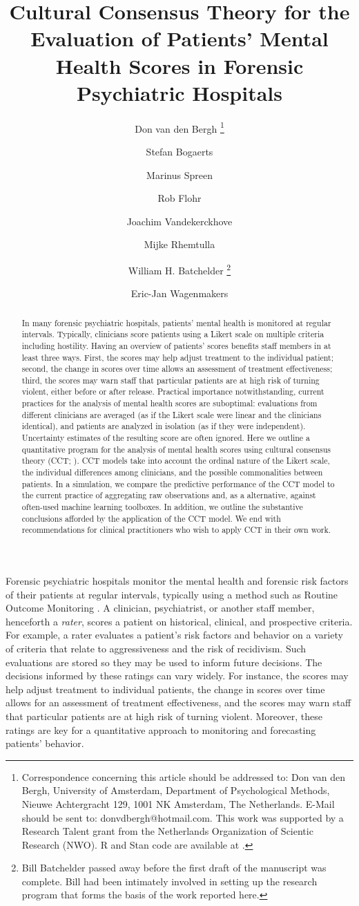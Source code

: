 \documentclass[a4paper,usenames,dvipsnames]{article}
\title{Cultural Consensus Theory for the Evaluation of Patients' Mental Health Scores in Forensic Psychiatric Hospitals}
\author[1]{Don van den Bergh%
\thanks{Correspondence concerning this article should be addressed to: Don van den Bergh, University of Amsterdam, Department of Psychological Methods, Nieuwe Achtergracht 129, 1001 NK Amsterdam, The Netherlands. E-Mail should be sent to: donvdbergh@hotmail.com. This work was supported by a Research Talent grant from the Netherlands Organization of Scientic Research (NWO). R and Stan code are available at \osflink{}.
}}
\author[2]{Stefan Bogaerts}
\author[3]{Marinus Spreen}
\author[3]{\authorcr Rob Flohr}
\author[4]{Joachim Vandekerckhove}
\author[5]{Mijke Rhemtulla}
\author[4]{\authorcr William H. Batchelder%
\thanks{Bill Batchelder passed away before the first draft of the manuscript was complete. Bill had been intimately involved in setting up the research program that forms the basis of the work reported here.}}
\author[1]{Eric-Jan Wagenmakers}
\affil[1]{University of Amsterdam}
\affil[2]{University of Tilburg}
\affil[3]{NHL Stenden University of Applied Sciences}
\affil[4]{University of California Irvine}
\affil[5]{University of California Davis}
\date{}
\begin{document}
\maketitle

\begin{abstract}
In many forensic psychiatric hospitals, patients' mental health is monitored at regular intervals. Typically, clinicians score patients using a Likert scale on multiple criteria including hostility. Having an overview of patients’ scores benefits staff members in at least three ways. First, the scores may help adjust treatment to the individual patient; second, the change in scores over time allows an assessment of treatment effectiveness; third, the scores may warn staff that particular patients are at high risk of turning violent, either before or after release. Practical importance notwithstanding, current practices for the analysis of mental health scores are suboptimal: evaluations from different clinicians are averaged (as if the Likert scale were linear and the clinicians identical), and patients are analyzed in isolation (as if they were independent). Uncertainty estimates of the resulting score are often ignored. Here we outline a quantitative program for the analysis of mental health scores using cultural consensus theory (CCT; ). CCT models take into account the ordinal nature of the Likert scale, the individual differences among clinicians, and the possible commonalities between patients. In a simulation, we compare the predictive performance of the CCT model to the current practice of aggregating raw observations and, as a  alternative, against often-used machine learning toolboxes. In addition, we outline the substantive conclusions afforded by the application of the CCT model. We end with recommendations for clinical practitioners who wish to apply CCT in their own work.
\end{abstract}
\newpage

Forensic psychiatric hospitals monitor the mental health and forensic risk factors of their patients at regular intervals, typically using a method such as Routine Outcome Monitoring \cite{deBeurs2011ROM}. A clinician, psychiatrist, or another staff member, henceforth a \textit{rater}, scores a patient on historical, clinical, and prospective criteria. For example, a rater evaluates a patient's risk factors and behavior on a variety of criteria that relate to aggressiveness and the risk of recidivism. Such evaluations are stored so they may be used to inform future decisions. The decisions informed by these ratings can vary widely. For instance, the scores may help adjust treatment to individual patients, the change in scores over time allows for an assessment of treatment effectiveness, and the scores may warn staff that particular patients are at high risk of turning violent. Moreover, these ratings are key for a quantitative approach to monitoring and forecasting patients' behavior.
\end{document}
